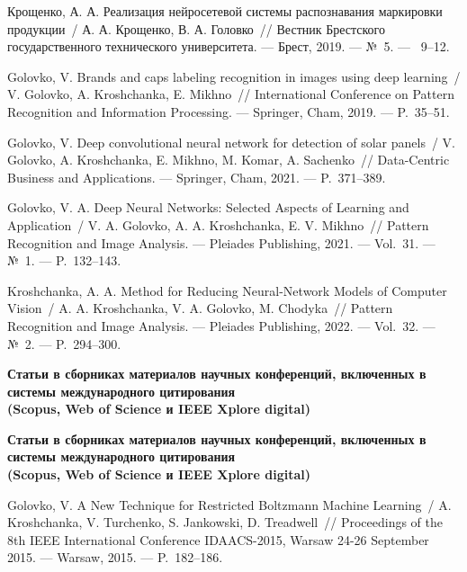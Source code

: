 Крощенко, А. А. Реализация нейросетевой системы распознавания маркировки продукции~/ А. А. Крощенко, В. А. Головко~//
  Вестник Брестского государственного технического университета. ---
\newblock Брест, 2019. ---
\newblock №~5. ---
~9--12.

Golovko, V. Brands and caps labeling recognition in images using deep learning~/ V. Golovko, A. Kroshchanka, E. Mikhno~//
  International Conference on Pattern Recognition and Information Processing. ---
\newblock Springer, Cham, 2019. ---
\newblock P.~35--51.

Golovko, V. Deep convolutional neural network for detection of solar panels~/ V. Golovko, A. Kroshchanka, E. Mikhno, M. Komar, A. Sachenko~//
  Data-Centric Business and Applications. ---
\newblock Springer, Cham, 2021. ---
\newblock P.~371--389.

Golovko,  V. A.  Deep Neural Networks: Selected Aspects of Learning and Application~/ V. A. Golovko, A. A. Kroshchanka, E. V. Mikhno~//
  Pattern Recognition and Image Analysis. ---
\newblock Pleiades Publishing, 2021. ---
\newblock Vol.~31. ---
\newblock №~1. ---
\newblock P.~132--143.

Kroshchanka, A. A. Method for Reducing Neural-Network Models of Computer Vision~/ A. A. Kroshchanka, V. A. Golovko, M. Chodyka~//
  Pattern Recognition and Image Analysis. ---
\newblock Pleiades Publishing, 2022. ---
\newblock Vol.~32. ---
\newblock №~2. ---
\newblock P.~294--300.

\ifx\isabstract\undefined 
\begin{center}
\vspace{3mm}
\newpage
{\bf Статьи в сборниках материалов научных конференций, включенных в системы международного цитирования\\ (Scopus, Web of Science и IEEE Xplore digital)}
\vspace{3mm}
\end{center}
\else
\vspace{2mm}
{\bf Статьи в сборниках материалов научных конференций, включенных в системы международного цитирования\\ (Scopus, Web of Science и IEEE Xplore digital)}
\vspace{2mm}
\fi

Golovko, V. A New Technique for Restricted Boltzmann Machine Learning~/ A. Kroshchanka, V. Turchenko, S. Jankowski, D. Treadwell~//
  Proceedings of the 8th IEEE International Conference IDAACS-2015, Warsaw 24-26 September 2015. ---
\newblock Warsaw, 2015. ---
\newblock P.~182--186.


